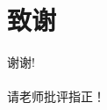 \documentclass{beamer}
\begin{document}




	\section*{致谢}  
	\begin{frame}
		\begin{center}
			\textcolor{myNewColorA}{\huge {谢谢!\\ \quad \\ 请老师批评指正！}}
		\end{center}
	\end{frame}
	
\end{document}

